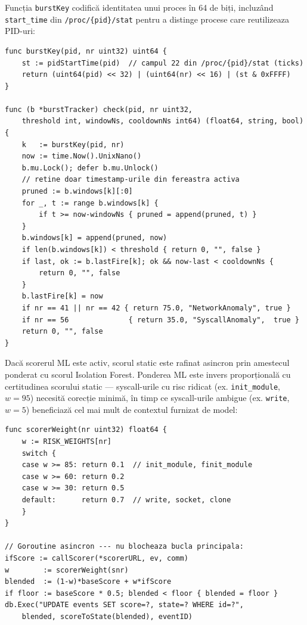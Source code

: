\par Funcția \texttt{burstKey} codifică identitatea unui proces în 64 de biți, incluzând \texttt{start\_time} din \texttt{/proc/\{pid\}/stat} pentru a distinge procese care reutilizeaza PID-uri:

\begin{lstlisting}[style=gostyle,caption={Cheia de burst și logica ferestrei glisante}]
func burstKey(pid, nr uint32) uint64 {
    st := pidStartTime(pid)  // campul 22 din /proc/{pid}/stat (ticks)
    return (uint64(pid) << 32) | (uint64(nr) << 16) | (st & 0xFFFF)
}

func (b *burstTracker) check(pid, nr uint32,
    threshold int, windowNs, cooldownNs int64) (float64, string, bool) {
    k   := burstKey(pid, nr)
    now := time.Now().UnixNano()
    b.mu.Lock(); defer b.mu.Unlock()
    // retine doar timestamp-urile din fereastra activa
    pruned := b.windows[k][:0]
    for _, t := range b.windows[k] {
        if t >= now-windowNs { pruned = append(pruned, t) }
    }
    b.windows[k] = append(pruned, now)
    if len(b.windows[k]) < threshold { return 0, "", false }
    if last, ok := b.lastFire[k]; ok && now-last < cooldownNs {
        return 0, "", false
    }
    b.lastFire[k] = now
    if nr == 41 || nr == 42 { return 75.0, "NetworkAnomaly", true }
    if nr == 56              { return 35.0, "SyscallAnomaly",  true }
    return 0, "", false
}
\end{lstlisting}

\par Dacă scorerul ML este activ, scorul static este rafinat asincron prin amestecul ponderat cu scorul Isolation Forest. Ponderea ML este invers proporțională cu certitudinea scorului static --- syscall-urile cu risc ridicat (ex. \texttt{init\_module}, $w=95$) necesită corecție minimă, în timp ce syscall-urile ambigue (ex. \texttt{write}, $w=5$) beneficiază cel mai mult de contextul furnizat de model:

\begin{lstlisting}[style=gostyle,caption={Ponderea ML și fuziunea scorurilor static și Isolation Forest}]
func scorerWeight(nr uint32) float64 {
    w := RISK_WEIGHTS[nr]
    switch {
    case w >= 85: return 0.1  // init_module, finit_module
    case w >= 60: return 0.2
    case w >= 30: return 0.5
    default:      return 0.7  // write, socket, clone
    }
}

// Goroutine asincron --- nu blocheaza bucla principala:
ifScore := callScorer(*scorerURL, ev, comm)
w        := scorerWeight(snr)
blended  := (1-w)*baseScore + w*ifScore
if floor := baseScore * 0.5; blended < floor { blended = floor }
db.Exec("UPDATE events SET score=?, state=? WHERE id=?",
    blended, scoreToState(blended), eventID)
\end{lstlisting}

